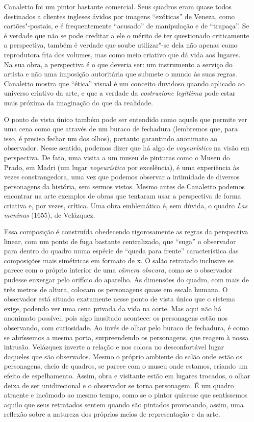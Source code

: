 Canaletto foi um pintor bastante comercial. Seus quadros eram quase
todos destinados a clientes ingleses ávidos por imagens ``exóticas'' de
Veneza, como cartões"-postais, e é frequentemente ``acusado'' de
manipulação e de ``trapaça''. Se é verdade que não se pode creditar a
ele o mérito de ter questionado criticamente a perspectiva, também é
verdade que soube utilizar"-se dela não apenas como reprodutora fria dos
volumes, mas como meio criativo que dá vida aos lugares. Na sua obra, a
perspectiva é o que deveria ser: um instrumento a serviço do artista e
não uma imposição autoritária que submete o mundo às suas regras.
Canaletto mostra que ``ética'' visual é um conceito duvidoso quando
aplicado ao universo criativo da arte, e que a verdade da
\emph{costruzione legittima} pode estar mais próxima da imaginação do
que da realidade.

O ponto de vista único também pode ser entendido como aquele
que permite ver uma cena como que através de um buraco de fechadura
(lembremos que, para isso, é preciso fechar um dos olhos), portanto
garantindo anonimato ao observador. Nesse sentido, podemos dizer que há
algo de \emph{voyeurístico} na visão em perspectiva. De fato, uma visita
a um museu de pinturas como o Museu do Prado, em Madri (um lugar
\emph{voyeurístico} por excelência), é uma experiência às vezes
constrangedora, uma vez que podemos observar a intimidade de diversos
personagens da história, sem sermos vistos.
Mesmo antes de Canaletto podemos encontrar na arte exemplos de obras que
tentaram usar a perspectiva de forma criativa e, por vezes, crítica. Uma
obra emblemática é, sem dúvida, o quadro \emph{Las meninas} (1655), de
Velázquez. 

Essa composição é construída obedecendo rigorosamente as regras da
perspectiva linear, com um ponto de fuga bastante centralizado, que
``suga'' o observador para dentro do quadro numa espécie de ``queda para
frente'' característica das composições mais simétricas em formato de x.
O salão retratado inclusive se parece com o próprio interior de uma
\emph{câmera obscura}, como se o observador pudesse enxergar pelo
orifício do aparelho. As dimensões do quadro, com mais de três metros de
altura, colocam os personagens quase em escala humana. O observador está
situado exatamente nesse ponto de vista único que o sistema exige,
podendo ver uma cena privada da vida na corte. Mas aqui não há anonimato
possível, pois algo inusitado acontece: os personagens estão nos
observando, com curiosidade. Ao invés de olhar pelo buraco de fechadura,
é como se abríssemos a mesma porta, surpreendendo os personagens, que
reagem à nossa intrusão. Velázquez inverte a relação e nos coloca no
desconfortável lugar daqueles que são observados. Mesmo o próprio
ambiente do salão onde estão os personagens, cheio de quadros, se parece
com o museu onde estamos, criando um efeito de espelhamento. Assim, obra
e visitante estão em lugares trocados, o olhar deixa de ser
unidirecional e o observador se torna personagem. É um quadro atraente e
incômodo ao mesmo tempo, como se o pintor quisesse que sentíssemos
aquilo que seus retratados sentem quando são pintados provocando, assim,
uma reflexão sobre a natureza dos próprios meios de representação e da
arte.

